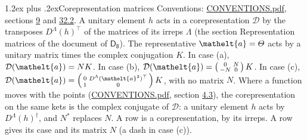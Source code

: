 \documentclass[10pt,a4paper]{article}
\makeatletter
\renewcommand\section{\@startsection{section}{1}{\z@}{-3ex plus -1ex minus -.2ex}%
  {1.2ex plus .2ex}{\normalfont\large\sffamily\bfseries\color{parttitle}}}
\numberwithin{equation}{section}
\newcommand{\eltfont}[1]{{\let\sigma\eltsigma\mathelt{#1}}}
\newcommand{\grp}[1]{\mathsf{#1}}
\newcommand{\elt}[1]{\eltfont{#1}}
\makeatother
\begin{document}
\section{Corepresentation matrices}\label{s:corep_matrices}
Conventions: \href{../../CONVENTIONS.pdf}{CONVENTIONS.pdf}, sections \href{../../../rotation/CONVENTIONS.pdf\#conv.9}{9} and \href{../../CONVENTIONS.pdf\#conv.32.2}{32.2}.
A unitary element $h$ acts in a corepresentation $\mathcal{D}$ by the transposes $D^{\Lambda}(h)^{\top}$ of the matrices of its irreps $\Lambda$ (the section Representation matrices of the document of \href{../../../rotation/data/pdf/D8.pdf}{$\grp{D_{8}}$}). The representative $\elt{a} = \varTheta$ acts by a unitary matrix times the complex conjugation $K$.
In case (a), $\mathcal{D}(\elt{a}) = NK$. In case (b), $\mathcal{D}(\elt{a}) = \left(\begin{smallmatrix} 0 & N \\ -N & 0 \end{smallmatrix}\right) K$. In case (c), $\mathcal{D}(\elt{a}) = \left(\begin{smallmatrix} 0 & D^{\Lambda}(\elt{a}^2)^{\top} \\ 1 & 0 \end{smallmatrix}\right) K$, with no matrix $N$.
Where a function moves with the points (\href{../../CONVENTIONS.pdf}{CONVENTIONS.pdf}, section \href{../../../rotation/CONVENTIONS.pdf\#conv.4.3}{4.3}), the corepresentation on the same kets is the complex conjugate of $\mathcal{D}$: a unitary element $h$ acts by $D^{\Lambda}(h)^{\dagger}$, and $N^{*}$ replaces $N$.
A row is a corepresentation, by its irreps. A row gives its case and its matrix $N$ (a dash in case (c)).
\end{document}
